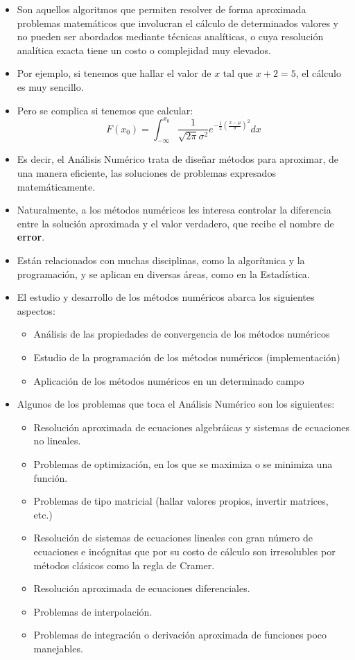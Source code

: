 \documentclass[openany]{book}
\providecommand{\tightlist}{%
  \setlength{\itemsep}{0pt}\setlength{\parskip}{0pt}}
\begin{document}
\begin{itemize}
\item
  Son aquellos algoritmos que permiten resolver de forma aproximada problemas matemáticos que involucran el cálculo de determinados valores y no pueden ser abordados mediante técnicas analíticas, o cuya resolución analítica exacta tiene un costo o complejidad muy elevados.
\item
  Por ejemplo, si tenemos que hallar el valor de \(x \text{ tal que } x + 2 = 5\), el cálculo es muy sencillo.
\item
  Pero se complica si tenemos que calcular:
  \[ F(x_0) = \int_{-\infty}^{x_0} \frac{1}{\sqrt{2\pi}\sigma^2}e^{-\frac{1}{2} \left( {\frac{x-\mu}{\sigma}}\right)^2}dx\]
\item
  Es decir, el Análisis Numérico trata de diseñar métodos para aproximar, de una
  manera eficiente, las soluciones de problemas expresados matemáticamente.
\item
  Naturalmente, a los métodos numéricos les interesa controlar la diferencia entre la solución aproximada y el valor verdadero, que recibe el nombre de \textbf{error}.
\item
  Están relacionados con muchas disciplinas, como la algorítmica y la programación, y se aplican en diversas áreas, como en la Estadística.
\item
  El estudio y desarrollo de los métodos numéricos abarca los siguientes aspectos:

  \begin{itemize}
  \tightlist
  \item
    Análisis de las propiedades de convergencia de los métodos numéricos
  \item
    Estudio de la programación de los métodos numéricos (implementación)
  \item
    Aplicación de los métodos numéricos en un determinado campo
  \end{itemize}
\item
  Algunos de los problemas que toca el Análisis Numérico son los siguientes:

  \begin{itemize}
  \tightlist
  \item
    Resolución aproximada de ecuaciones algebráicas y sistemas de ecuaciones no lineales.
  \item
    Problemas de optimización, en los que se maximiza o se minimiza una función.
  \item
    Problemas de tipo matricial (hallar valores propios, invertir matrices, etc.)
  \item
    Resolución de sistemas de ecuaciones lineales con gran número de ecuaciones e incógnitas que por su costo de cálculo son irresolubles por métodos clásicos como la regla de Cramer.
  \item
    Resolución aproximada de ecuaciones diferenciales.
  \item
    Problemas de interpolación.
  \item
    Problemas de integración o derivación aproximada de funciones poco manejables.
  \end{itemize}
\end{itemize}
\end{document}
